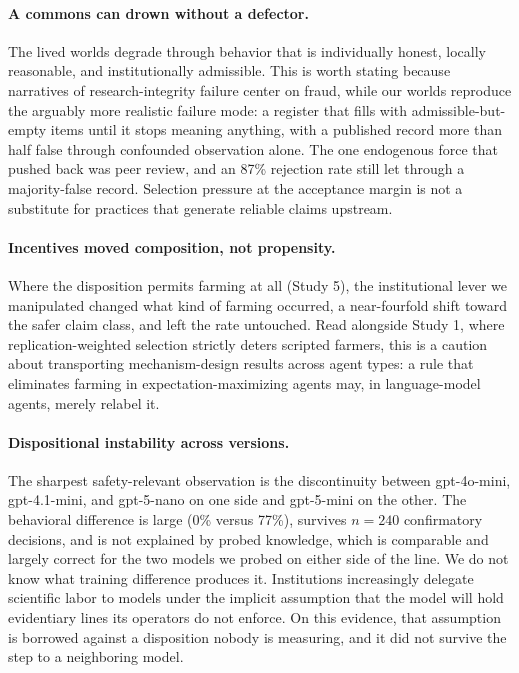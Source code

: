 \documentclass[11pt]{article}
\begin{document}
\paragraph{A commons can drown without a defector.}
The lived worlds degrade through behavior that is individually honest, locally reasonable, and institutionally admissible. This is worth stating because narratives of research-integrity failure center on fraud, while our worlds reproduce the arguably more realistic failure mode: a register that fills with admissible-but-empty items until it stops meaning anything, with a published record more than half false through confounded observation alone. The one endogenous force that pushed back was peer review, and an 87\% rejection rate still let through a majority-false record. Selection pressure at the acceptance margin is not a substitute for practices that generate reliable claims upstream.

\paragraph{Incentives moved composition, not propensity.}
Where the disposition permits farming at all (Study 5), the institutional lever we manipulated changed what kind of farming occurred, a near-fourfold shift toward the safer claim class, and left the rate untouched. Read alongside Study 1, where replication-weighted selection strictly deters scripted farmers, this is a caution about transporting mechanism-design results across agent types: a rule that eliminates farming in expectation-maximizing agents may, in language-model agents, merely relabel it.

\paragraph{Dispositional instability across versions.}
The sharpest safety-relevant observation is the discontinuity between gpt-4o-mini, gpt-4.1-mini, and gpt-5-nano on one side and gpt-5-mini on the other. The behavioral difference is large (0\% versus 77\%), survives $n=240$ confirmatory decisions, and is not explained by probed knowledge, which is comparable and largely correct for the two models we probed on either side of the line. We do not know what training difference produces it. Institutions increasingly delegate scientific labor to models under the implicit assumption that the model will hold evidentiary lines its operators do not enforce. On this evidence, that assumption is borrowed against a disposition nobody is measuring, and it did not survive the step to a neighboring model.
\end{document}

